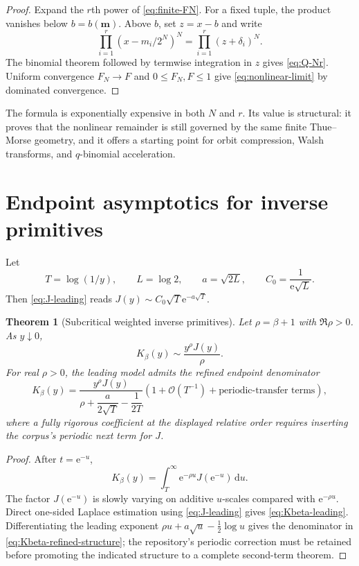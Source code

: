 \documentclass[11pt,oneside]{article}
\numberwithin{equation}{section}
\newtheorem{theorem}{Theorem}[section]
\theoremstyle{definition}
\theoremstyle{remark}
\newcommand{\InvF}{J}
\newcommand{\e}{\mathrm e}
\newcommand{\dd}{\,\mathrm d}
\newcommand{\bigO}{\mathcal O}
\begin{document}
\begin{proof}
Expand the $r$th power of \eqref{eq:finite-FN}.  For a fixed tuple, the product
vanishes below $b=b(\bm m)$.  Above $b$, set $z=x-b$ and write
\[
 \prod_{i=1}^{r}(x-m_i/2^N)^N
 =\prod_{i=1}^{r}(z+\delta_i)^N.
\]
The binomial theorem followed by termwise integration in $z$ gives
\eqref{eq:Q-Nr}.  Uniform convergence $F_N\to F$ and $0\le F_N,F\le1$ give
\eqref{eq:nonlinear-limit} by dominated convergence.
\end{proof}

The formula is exponentially expensive in both $N$ and $r$.  Its value is
structural: it proves that the nonlinear remainder is still governed by the
same finite Thue--Morse geometry, and it offers a starting point for orbit
compression, Walsh transforms, and $q$-binomial acceleration.

\section{Endpoint asymptotics for inverse primitives}
\label{sec:inverse-endpoint}

Let
\begin{equation}
 T=\log(1/y),\qquad L=\log2,\qquad
 a=\sqrt{2L},\qquad C_0=\frac1{\e\sqrt L}.                 \label{eq:endpoint-constants}
\end{equation}
Then \eqref{eq:J-leading} reads
$\InvF(y)\sim C_0\sqrt T\e^{-a\sqrt T}$.

\begin{theorem}[Subcritical weighted inverse primitives]
\label{thm:inverse-endpoint-subcritical}
Let $\rho=\beta+1$ with $\Re\rho>0$.  As $y\downarrow0$,
\begin{equation}
 \boxed{
 K_\beta(y)\sim\frac{y^\rho\InvF(y)}{\rho}.}              \label{eq:Kbeta-leading}
\end{equation}
For real $\rho>0$, the leading model admits the refined endpoint denominator
\begin{equation}
 K_\beta(y)=
 \frac{y^\rho\InvF(y)}{\rho+\dfrac{a}{2\sqrt T}-\dfrac1{2T}}
 \left(1+\bigO(T^{-1})+\text{periodic-transfer terms}\right), \label{eq:Kbeta-refined-structure}
\end{equation}
where a fully rigorous coefficient at the displayed relative order requires
inserting the corpus's periodic next term for $\InvF$.
\end{theorem}

\begin{proof}
After $t=\e^{-u}$,
\[
 K_\beta(y)=\int_T^\infty\e^{-\rho u}\InvF(\e^{-u})\dd u.
\]
The factor $\InvF(\e^{-u})$ is slowly varying on additive $u$-scales compared
with $\e^{-\rho u}$.  Direct one-sided Laplace estimation using
\eqref{eq:J-leading} gives \eqref{eq:Kbeta-leading}.  Differentiating the
leading exponent
$\rho u+a\sqrt u-\frac12\log u$ gives the denominator in
\eqref{eq:Kbeta-refined-structure}; the repository's periodic correction must
be retained before promoting the indicated structure to a complete second-term
theorem.
\end{proof}
\end{document}
